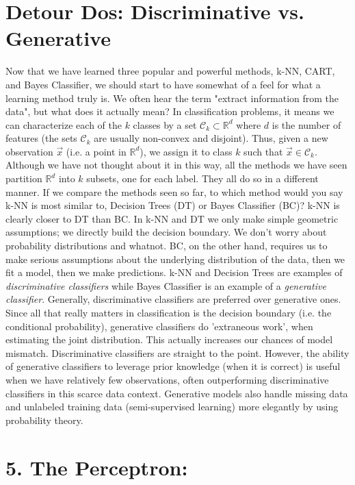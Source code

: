 \documentclass[10pt]{article}
\begin{document}
\section*{Detour Dos: Discriminative vs. Generative}
	Now that we have learned three popular and powerful methods, k-NN, CART, and Bayes Classifier, 
	we should start to have somewhat of a feel for what a learning method truly is. We often hear the term 
	"extract information from the data", but what does it actually mean? In classification problems, it means 
	we can characterize each of the $k$ classes by a set $\mathcal C_k \subset \mathbb{R}^d$ where $d$ 
	is the number of features (the sets $\mathcal C_k$ are usually non-convex and disjoint). Thus, given a
	new observation $\vec x$ (i.e. a point in $\mathbb{R}^d$), we assign it to class $k$ such that 
	$\vec x \in \mathcal C_k$. Although we have not thought about it in this way, all the methods we have
	 seen partition $\mathbb{R}^d$ into $k$ subsets, one for each label. They all do so in a different manner.
	 If we compare the methods seen so far, to which method would you say k-NN is most similar to, Decision 
	 Trees (DT) or Bayes Classifier (BC)? k-NN is clearly closer to DT than BC. In k-NN and DT we only 
	 make simple geometric assumptions; we directly build the decision boundary. We don't worry about
	 probability distributions and whatnot. BC, on the other hand, requires us to make serious assumptions about the 
	 underlying distribution of the data, then we fit a model, then we make predictions. k-NN and Decision
	 Trees are examples of \textit{discriminative classifiers} while Bayes Classifier is an example of a
	 \textit{generative classifier}. Generally, discriminative classifiers are preferred over generative ones. 
	 Since all that  really matters in classification is the decision boundary (i.e. the conditional probability), 
	 generative classifiers do 'extraneous work',  when estimating the joint distribution. This actually 
	 increases our chances of model mismatch. Discriminative classifiers are straight to the point. 
	 However, the ability of generative classifiers to leverage prior knowledge (when it is correct) is useful 
	 when we have relatively few observations, often outperforming discriminative classifiers in this scarce 
	 data context. Generative models also handle missing data and unlabeled training data 
	 (semi-supervised learning) more elegantly by using probability theory. 
	 
\section*{5. The Perceptron:}
\end{document}
